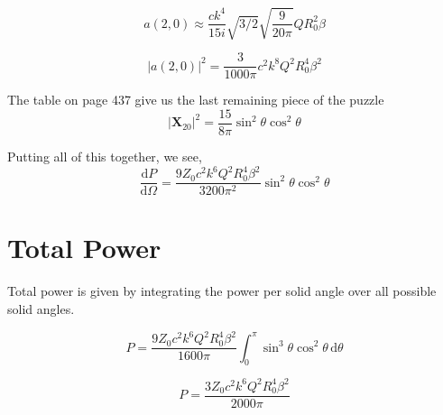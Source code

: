 \documentclass[10pt,a4paper]{article}
\begin{document}
\begin{equation}
a(2,0)\approx \frac{ck^4}{15i}\sqrt{3/2}\sqrt{\frac{9}{20\pi}}QR_0^2\beta
\end{equation}

\begin{equation}
\left|a(2,0)\right|^2=\frac{3}{1000\pi}c^2k^8Q^2R_0^4\beta^2
\end{equation}

The table on page 437 give us the last remaining piece of the puzzle
\begin{equation}
\left|\mathbf{X}_{20}\right|^2=\frac{15}{8\pi}\sin^2\theta\cos^2\theta
\end{equation}

Putting all of this together, we see,
\begin{equation}
\frac{\mathrm{d}P}{\mathrm{d}\Omega}=\frac{9Z_0c^2k^6Q^2R_0^4\beta^2}{3200\pi^2}\sin^2\theta\cos^2\theta
\end{equation}

\section{Total Power}
Total power is given by integrating the power per solid angle over all possible solid angles.

\begin{equation}
P=\frac{9Z_0c^2k^6Q^2R_0^4\beta^2}{1600\pi}\int_0^\pi  \sin^3\theta\cos^2\theta\,\mathrm{d}\theta
\end{equation}

\begin{equation}
P=\frac{3Z_0c^2k^6Q^2R_0^4\beta^2}{2000\pi}
\end{equation}
\end{document}
